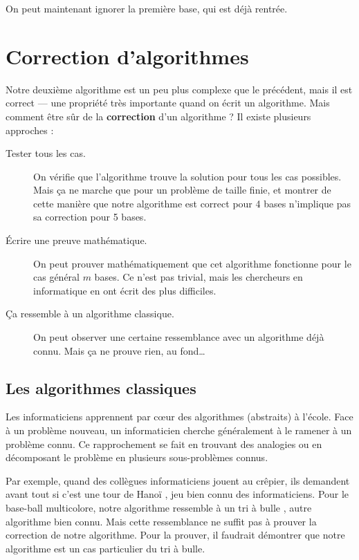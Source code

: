 On peut maintenant ignorer la première base, qui est déjà rentrée.

\section*{Correction d'algorithmes}

Notre deuxième algorithme est un peu plus complexe que le précédent, mais il est
correct --- une propriété très importante quand on écrit un algorithme. Mais
comment être sûr de la \textbf{correction} d'un algorithme ? Il existe plusieurs
approches :

\begin{description}
\item[Tester tous les cas.] On vérifie que l'algorithme trouve la solution pour
  tous les cas possibles. Mais ça ne marche que pour un problème de taille
  finie, et montrer de cette manière que notre algorithme est correct pour 4
  bases n'implique pas sa correction pour 5 bases.
\item[Écrire une preuve mathématique.] On peut prouver mathématiquement que cet
  algorithme fonctionne pour le cas général $m$ bases. Ce n'est pas trivial,
  mais les chercheurs en informatique en ont écrit des plus difficiles.
\item[Ça ressemble à un algorithme classique.] On peut observer une certaine
  ressemblance avec un algorithme déjà connu. Mais ça ne prouve rien, au
  fond{\ldots}
\end{description}

\subsection*{Les algorithmes classiques}

Les informaticiens apprennent par c\oe{}ur des algorithmes (abstraits) à
l'école. Face à un problème nouveau, un informaticien cherche généralement à le
ramener à un problème connu. Ce rapprochement se fait en trouvant des analogies
ou en décomposant le problème en plusieurs sous-problèmes connus.

Par exemple, quand des collègues informaticiens jouent au crêpier, ils demandent
avant tout si c'est \og une tour de Hanoï \fg, jeu bien connu des
informaticiens. Pour le base-ball multicolore, notre algorithme ressemble à un
\og tri à bulle \fg, autre algorithme bien connu. Mais cette ressemblance ne
suffit pas à prouver la correction de notre algorithme. Pour la prouver, il
faudrait démontrer que notre algorithme est un cas particulier du tri à bulle.
 
